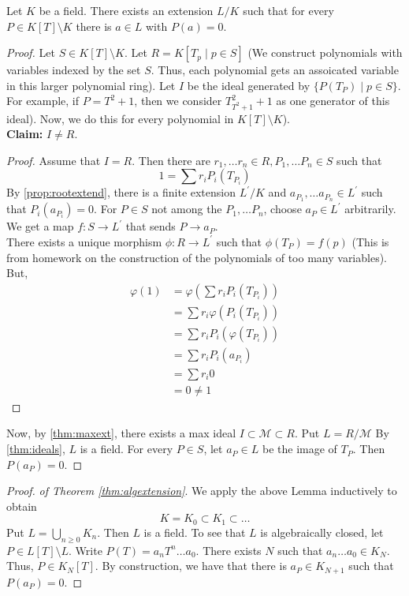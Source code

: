 \begin{lemma}
    Let $K$ be a field. There exists an extension $L / K$ such that for every
    $P \in K[T] \setminus K$ there is $a \in L$ with $P(a) = 0$.
\end{lemma}
\begin{proof}
    Let $S \in K[T] \setminus K$. Let $R = K[T_p \mid p \in S]$ (We construct polynomials
    with variables indexed by the set $S$. Thus, each polynomial gets an assoicated variable in this
    larger polynomial ring). Let $I$ be the ideal generated by $\{P(T_P) \mid p \in S \}$. For example,
    if $P = T^2 + 1$, then we consider $T_{T^2 + 1}^2 + 1$ as one generator of this ideal). Now,
    we do this for every polynomial in $K[T] \setminus K$). \\
    \textbf{Claim:} $I \neq R$. \\
    \begin{proof}
        Assume that $I = R$. Then there are $r_1, \dots r_n \in R, P_1, \dots P_n \in S$
        such that
        $$
        1 = \sum{r_iP_i(T_{P_i})}
        $$
        By \ref{prop:rootextend}, there is a finite extension $L^\prime / K$ and $a_{P_1}, \dots
        a_{P_n} \in L^\prime$ such that $P_i(a_{P_i}) = 0$. For $P \in S$ not among the $P_1, \dots P_n$, choose
        $a_P \in L^\prime$ arbitrarily. We get a map $f:S \rightarrow L^\prime$ that sends
        $P \rightarrow a_P$. \\
        There exists a unique morphism $\phi: R \rightarrow L^\prime$ such that $\phi(T_P) = f(p)$ (This is
        from homework on the construction of the polynomials of too many variables). But,
        \begin{align*}
            \varphi(1) &= \varphi\left(\sum{r_iP_i(T_{P_i})}\right) \\
            &= \sum{r_i\varphi(P_i(T_{P_i}))} \\
            &= \sum{r_iP_i(\varphi(T_{P_i}))} \\
            &= \sum{r_iP_i(a_{P_i})} \\
            &= \sum{r_i0} \\
            &= 0 \neq 1
        \end{align*}
    \end{proof}
    Now, by \ref{thm:maxext}, there exists a max ideal $I \subset \mathcal{M} \subset R$.
    Put $L = R / \mathcal{M}$ By \ref{thm:ideals}, $L$ is a field. For every $P \in S$,
    let $a_P \in L$ be the image of $T_P$. Then $P(a_{P}) = 0$.
\end{proof}

\begin{proof}
    \textit{of Theorem \ref{thm:algextension}}. We apply the above Lemma inductively
    to obtain
    $$
    K = K_0 \subset K_1 \subset \dots
    $$
    Put $L = \bigcup_{n \geq 0}{K_n}$. Then $L$ is a field. To see that $L$ is algebraically
    closed, let $P \in L[T] \setminus L$. Write $P(T) = a_nT^n \dots a_0$.
    There exists $N$ such that $a_n \dots a_0 \in K_N$. Thus, $P \in K_N[T]$. By
    construction, we have that there is $a_P \in K_{N+1}$ such that $P(a_P) = 0$. 
\end{proof}
